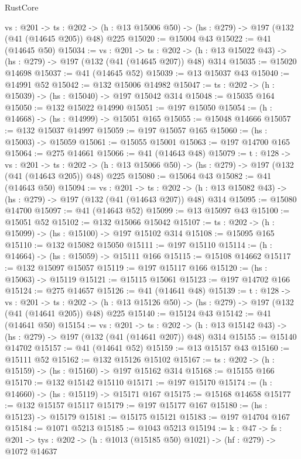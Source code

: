 \begin{lexlean}{RustCore}
\begin{coremodule}
  {vs : @201} ->
  {ts : @202} -> (h : @13 @15006 @50) -> (hs : @279) -> @197 (@132 (@41 (@14645 @205)) @48) @225
@15020 := @15004 @43
@15022 := @41 (@14645 @50)
@15034 := {vs : @201} ->
  {ts : @202} -> (h : @13 @15022 @43) -> (hs : @279) -> @197 (@132 (@41 (@14645 @207)) @48) @314
@15035 := @15020 @14698
@15037 := @41 (@14645 @52)
@15039 := @13 @15037 @43
@15040 := @14991 @52
@15042 := @132 @15006 @14982
@15047 := {ts : @202} -> (h : @15039) -> (hs : @15040) -> @197 @15042 @314
@15048 := @15035 @164
@15050 := @132 @15022 @14990
@15051 := @197 @15050
@15054 := (h : @14668) -> (hs : @14999) -> @15051 @165
@15055 := @15048 @14666
@15057 := @132 @15037 @14997
@15059 := @197 @15057 @165
@15060 := (hs : @15003) -> @15059
@15061 := @15055 @15001
@15063 := @197 @14700 @165
@15064 := @275 @14661
@15066 := @41 (@14643 @48)
@15079 := {t : @128} ->
  {vs : @201} ->
  {ts : @202} -> (h : @13 @15066 @50) -> (hs : @279) -> @197 (@132 (@41 (@14643 @205)) @48) @225
@15080 := @15064 @43
@15082 := @41 (@14643 @50)
@15094 := {vs : @201} ->
  {ts : @202} -> (h : @13 @15082 @43) -> (hs : @279) -> @197 (@132 (@41 (@14643 @207)) @48) @314
@15095 := @15080 @14700
@15097 := @41 (@14643 @52)
@15099 := @13 @15097 @43
@15100 := @15051 @52
@15102 := @132 @15066 @15042
@15107 := {ts : @202} -> (h : @15099) -> (hs : @15100) -> @197 @15102 @314
@15108 := @15095 @165
@15110 := @132 @15082 @15050
@15111 := @197 @15110
@15114 := (h : @14664) -> (hs : @15059) -> @15111 @166
@15115 := @15108 @14662
@15117 := @132 @15097 @15057
@15119 := @197 @15117 @166
@15120 := (hs : @15063) -> @15119
@15121 := @15115 @15061
@15123 := @197 @14702 @166
@15124 := @275 @14657
@15126 := @41 (@14641 @48)
@15139 := {t : @128} ->
  {vs : @201} ->
  {ts : @202} -> (h : @13 @15126 @50) -> (hs : @279) -> @197 (@132 (@41 (@14641 @205)) @48) @225
@15140 := @15124 @43
@15142 := @41 (@14641 @50)
@15154 := {vs : @201} ->
  {ts : @202} -> (h : @13 @15142 @43) -> (hs : @279) -> @197 (@132 (@41 (@14641 @207)) @48) @314
@15155 := @15140 @14702
@15157 := @41 (@14641 @52)
@15159 := @13 @15157 @43
@15160 := @15111 @52
@15162 := @132 @15126 @15102
@15167 := {ts : @202} -> (h : @15159) -> (hs : @15160) -> @197 @15162 @314
@15168 := @15155 @166
@15170 := @132 @15142 @15110
@15171 := @197 @15170
@15174 := (h : @14660) -> (hs : @15119) -> @15171 @167
@15175 := @15168 @14658
@15177 := @132 @15157 @15117
@15179 := @197 @15177 @167
@15180 := (hs : @15123) -> @15179
@15181 := @15175 @15121
@15183 := @197 @14704 @167
@15184 := @1071 @5213
@15185 := @1043 @5213
@15194 := {k : @47} ->
  {fs : @201} -> {tys : @202} -> (h : @1013 (@15185 @50) @1021) -> (hf : @279) -> @1072 @14637

\end{coremodule}
\end{lexlean}

